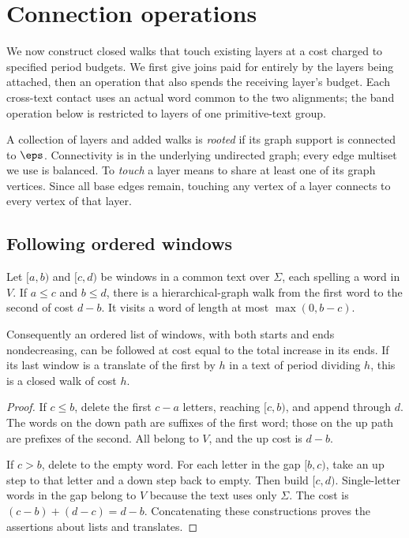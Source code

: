 \section{Connection operations}\label{sec:connections}

We now construct closed walks that touch existing layers at a cost charged to specified period budgets. We first give joins paid for entirely by the layers being attached, then an operation that also spends the receiving layer's budget. Each cross-text contact uses an actual word common to the two alignments; the band operation below is restricted to layers of one primitive-text group.

A collection of layers and added walks is \emph{rooted} if its graph support is connected to $\eps$. Connectivity is in the underlying undirected graph; every edge multiset we use is balanced. To \emph{touch} a layer means to share at least one of its graph vertices. Since all base edges remain, touching any vertex of a layer connects to every vertex of that layer.

\subsection{Following ordered windows}

\begin{lemma}\label{lem:ordered-windows}
Let $[a,b)$ and $[c,d)$ be windows in a common text over $\Sigma$, each spelling a word in $V$. If $a\le c$ and $b\le d$, there is a hierarchical-graph walk from the first word to the second of cost $d-b$. It visits a word of length at most $\max(0,b-c)$.

Consequently an ordered list of windows, with both starts and ends nondecreasing, can be followed at cost equal to the total increase in its ends. If its last window is a translate of the first by $h$ in a text of period dividing $h$, this is a closed walk of cost $h$.
\end{lemma}

\begin{proof}
If $c\le b$, delete the first $c-a$ letters, reaching $[c,b)$, and append through $d$. The words on the down path are suffixes of the first word; those on the up path are prefixes of the second. All belong to $V$, and the up cost is $d-b$.

If $c>b$, delete to the empty word. For each letter in the gap $[b,c)$, take an up step to that letter and a down step back to empty. Then build $[c,d)$. Single-letter words in the gap belong to $V$ because the text uses only $\Sigma$. The cost is $(c-b)+(d-c)=d-b$. Concatenating these constructions proves the assertions about lists and translates.
\end{proof}

